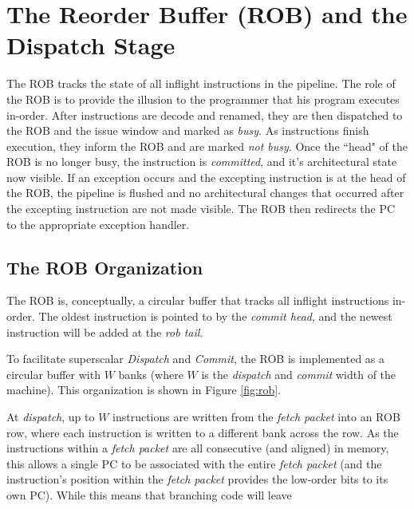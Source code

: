 \chapter{The Reorder Buffer (ROB) and the Dispatch Stage}\label{chapter:rob}


The ROB tracks the state of all inflight instructions in the pipeline. The role of the ROB is to provide the illusion to the programmer that his program executes in-order. 
After instructions are decode and renamed, they are then dispatched to the ROB and the issue window and marked as {\em busy}. 
As instructions finish execution, they inform the ROB and are marked {\em not busy}. 
Once the ``head" of the ROB is no longer busy, the instruction is {\em committed}, and it's architectural state now visible. If an exception occurs and the excepting instruction is at the head of the ROB, the pipeline is flushed and no architectural changes that occurred after the excepting instruction are not made visible. The ROB then redirects the PC to the appropriate exception handler. 

\section{The ROB Organization}

The ROB is, conceptually, a circular buffer that tracks all inflight instructions in-order. The oldest instruction is pointed to by the {\em commit head}, and the newest instruction will be added at the {\em rob tail}. 

To facilitate superscalar {\em Dispatch} and {\em Commit}, the ROB is implemented as a circular buffer with $W$ banks (where $W$ is the {\em dispatch} and {\em commit} width of the machine). This organization is shown in Figure \ref{fig:rob}. 


At {\em dispatch}, up to $W$ instructions are written from the {\em fetch packet} into an ROB row, where each instruction is written to a different bank across the row.  As the instructions within a {\em fetch packet} are all consecutive (and aligned) in memory, this allows a single PC to be associated with the entire {\em fetch packet} (and the instruction's position within the {\em fetch packet} provides the low-order bits to its own PC).  While this means that branching code will leave 

